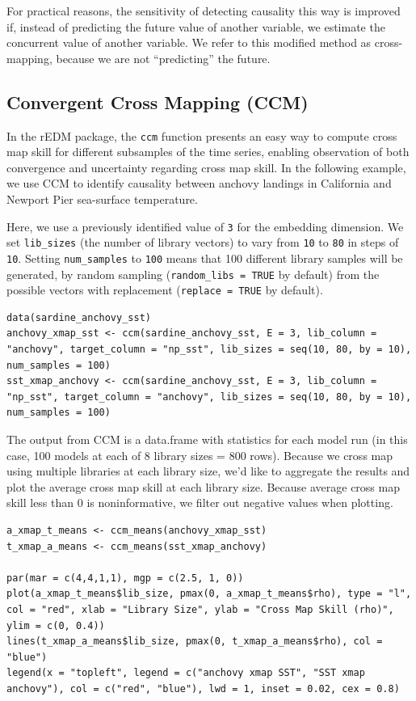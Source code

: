 For practical reasons, the sensitivity of detecting causality this way is improved if, instead of predicting the future value of another variable, we estimate the concurrent value of another variable. We refer to this modified method as cross-mapping, because we are not ``predicting'' the future.

\subsection{Convergent Cross Mapping (CCM)}

In the rEDM package, the \lstinline{ccm} function presents an easy way to compute cross map skill for different subsamples of the time series, enabling observation of both convergence and uncertainty regarding cross map skill. In the following example, we use CCM to identify causality between anchovy landings in California and Newport Pier sea-surface temperature. 

Here, we use a previously identified value of \lstinline{3} for the embedding dimension. We set \lstinline{lib_sizes} (the number of library vectors) to vary from \lstinline{10} to \lstinline{80} in steps of \lstinline{10}. Setting \lstinline{num_samples} to \lstinline{100} means that 100 different library samples will be generated, by random sampling (\lstinline{random_libs = TRUE} by default) from the possible vectors with replacement (\lstinline{replace = TRUE} by default). 

\begin{lstlisting}
data(sardine_anchovy_sst)
anchovy_xmap_sst <- ccm(sardine_anchovy_sst, E = 3, lib_column = "anchovy", target_column = "np_sst", lib_sizes = seq(10, 80, by = 10), num_samples = 100)
sst_xmap_anchovy <- ccm(sardine_anchovy_sst, E = 3, lib_column = "np_sst", target_column = "anchovy", lib_sizes = seq(10, 80, by = 10), num_samples = 100)
\end{lstlisting}

The output from CCM is a data.frame with statistics for each model run (in this case, 100 models at each of 8 library sizes = 800 rows). Because we cross map using multiple libraries at each library size, we'd like to aggregate the results and plot the average cross map skill at each library size. Because average cross map skill less than $0$ is noninformative, we filter out negative values when plotting.

\begin{lstlisting}
a_xmap_t_means <- ccm_means(anchovy_xmap_sst)
t_xmap_a_means <- ccm_means(sst_xmap_anchovy)

par(mar = c(4,4,1,1), mgp = c(2.5, 1, 0))
plot(a_xmap_t_means$lib_size, pmax(0, a_xmap_t_means$rho), type = "l", col = "red", xlab = "Library Size", ylab = "Cross Map Skill (rho)", ylim = c(0, 0.4))
lines(t_xmap_a_means$lib_size, pmax(0, t_xmap_a_means$rho), col = "blue")
legend(x = "topleft", legend = c("anchovy xmap SST", "SST xmap anchovy"), col = c("red", "blue"), lwd = 1, inset = 0.02, cex = 0.8)
\end{lstlisting}

